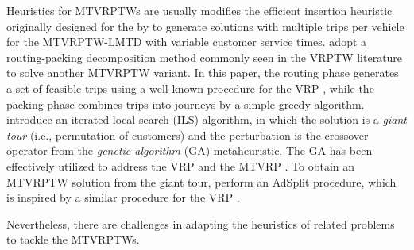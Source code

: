 Heuristics for MTVRPTWs are usually   \cite{karoonsoontawong2015efficient} modifies the efficient insertion heuristic originally designed for the  by \cite{campbell2004efficient} to generate solutions with multiple trips per vehicle for the MTVRPTW-LMTD with variable customer service times.  \cite{battarra2009adaptive} adopt a routing-packing decomposition method commonly seen in the VRPTW literature \citep[e.g.,][]{fleischmann1990vehicle, taillard1996vehicle} to solve another MTVRPTW variant.  In this paper, the routing phase generates a set of feasible trips using a well-known procedure for the VRP \citep{christofides1976vehicle}, while the packing phase combines trips into journeys by a simple greedy algorithm.  \cite{cattaruzza2014iterated} introduce an iterated local search (ILS) algorithm, in which the solution is a \textit{giant tour} (i.e., permutation of customers) and the perturbation is the crossover operator from the \textit{genetic algorithm} (GA) metaheuristic.  The GA has been effectively utilized to address the VRP and the MTVRP \citep{prins2004simple, cattaruzza2014memetic}.  To obtain an MTVRPTW solution from the giant tour, \cite{cattaruzza2014iterated} perform an AdSplit procedure, which is inspired by a similar procedure for the VRP \citep{prins2004simple}.
\newline


Nevertheless, there are challenges in adapting the heuristics of related problems to tackle the MTVRPTWs.  

